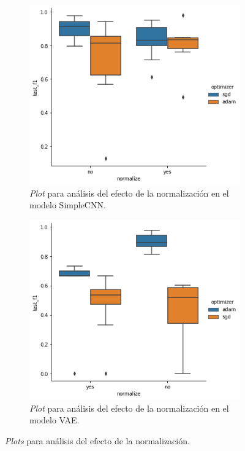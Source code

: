 \begin{figure}[H]
\begin{subfigure}{.5\textwidth}
  \centering
  \includegraphics[width=.8\linewidth]{imagenes/06_Experimentacion/normalization/simplecnnnorm.png}  
  \caption{\textit{Plot} para análisis del efecto de la normalización en el modelo SimpleCNN.}
  \label{fig:simplecnnnorm}
\end{subfigure}
\begin{subfigure}{.5\textwidth}
  \centering
  \includegraphics[width=.8\linewidth]{imagenes/06_Experimentacion/normalization/vaenorm.png}  
  \caption{\textit{Plot} para análisis del efecto de la normalización en el modelo VAE.}
  \label{fig:vaenorm}
\end{subfigure}
\caption{\textit{Plots} para análisis del efecto de la normalización.}
\label{fig:normalization}
\end{figure}
